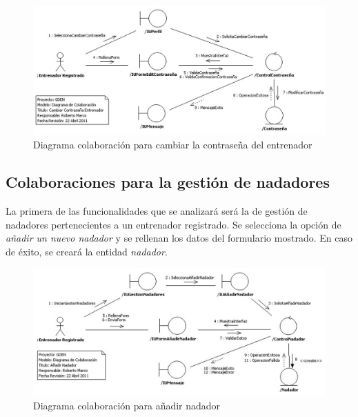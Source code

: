 			\begin{figure}[H]
			  \centering
			    \includegraphics[width=16cm]{./eps/colaboraciones/gestion_perfil/CambiarContrasenaEntrenador.eps}
			  \caption{Diagrama colaboración para cambiar la contraseña del entrenador}
			  \label{fig:col_cambiar_contrasena}
			\end{figure}
		
	
		\subsection{Colaboraciones para la gestión de nadadores} %
			\label{sub:colaboraciones_para_la_gestion_de_nadadores}
		
		La primera de las funcionalidades que se analizará será la de gestión de nadadores pertenecientes a un entrenador registrado. Se selecciona la opción de {\it añadir un nuevo nadador} y se rellenan los datos del formulario mostrado. En caso de éxito, se creará la entidad {\it nadador}.
		
			\begin{figure}[H]
			  \centering
			    \includegraphics[width=16cm]{./eps/colaboraciones/gestion_nadadores/AnadirNadador.eps}
			  \caption{Diagrama colaboración para añadir nadador}
			  \label{fig:col_anadir_nadador}
			\end{figure}
		
